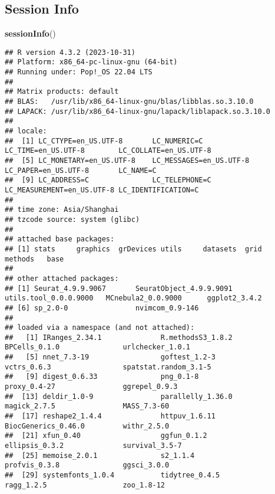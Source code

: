 \documentclass[
]{article}
\newenvironment{Shaded}{\begin{snugshade}}{\end{snugshade}}
\newcommand{\KeywordTok}[1]{\textcolor[rgb]{0.13,0.29,0.53}{\textbf{#1}}}
\newcommand{\NormalTok}[1]{#1}
\begin{document}
\hypertarget{session-info}{%
\subsection{Session Info}\label{session-info}}

\begin{Shaded}
\begin{Highlighting}[]
\KeywordTok{sessionInfo}\NormalTok{()}
\end{Highlighting}
\end{Shaded}

\begin{verbatim}
## R version 4.3.2 (2023-10-31)
## Platform: x86_64-pc-linux-gnu (64-bit)
## Running under: Pop!_OS 22.04 LTS
## 
## Matrix products: default
## BLAS:   /usr/lib/x86_64-linux-gnu/blas/libblas.so.3.10.0 
## LAPACK: /usr/lib/x86_64-linux-gnu/lapack/liblapack.so.3.10.0
## 
## locale:
##  [1] LC_CTYPE=en_US.UTF-8       LC_NUMERIC=C               LC_TIME=en_US.UTF-8        LC_COLLATE=en_US.UTF-8    
##  [5] LC_MONETARY=en_US.UTF-8    LC_MESSAGES=en_US.UTF-8    LC_PAPER=en_US.UTF-8       LC_NAME=C                 
##  [9] LC_ADDRESS=C               LC_TELEPHONE=C             LC_MEASUREMENT=en_US.UTF-8 LC_IDENTIFICATION=C       
## 
## time zone: Asia/Shanghai
## tzcode source: system (glibc)
## 
## attached base packages:
## [1] stats     graphics  grDevices utils     datasets  grid      methods   base     
## 
## other attached packages:
## [1] Seurat_4.9.9.9067       SeuratObject_4.9.9.9091 utils.tool_0.0.0.9000   MCnebula2_0.0.9000      ggplot2_3.4.2          
## [6] sp_2.0-0                nvimcom_0.9-146        
## 
## loaded via a namespace (and not attached):
##   [1] IRanges_2.34.1              R.methodsS3_1.8.2           BPCells_0.1.0               urlchecker_1.0.1           
##   [5] nnet_7.3-19                 goftest_1.2-3               vctrs_0.6.3                 spatstat.random_3.1-5      
##   [9] digest_0.6.33               png_0.1-8                   proxy_0.4-27                ggrepel_0.9.3              
##  [13] deldir_1.0-9                parallelly_1.36.0           magick_2.7.5                MASS_7.3-60                
##  [17] reshape2_1.4.4              httpuv_1.6.11               BiocGenerics_0.46.0         withr_2.5.0                
##  [21] xfun_0.40                   ggfun_0.1.2                 ellipsis_0.3.2              survival_3.5-7             
##  [25] memoise_2.0.1               s2_1.1.4                    profvis_0.3.8               ggsci_3.0.0                
##  [29] systemfonts_1.0.4           tidytree_0.4.5              ragg_1.2.5                  zoo_1.8-12                 

\end{verbatim}
\end{document}
